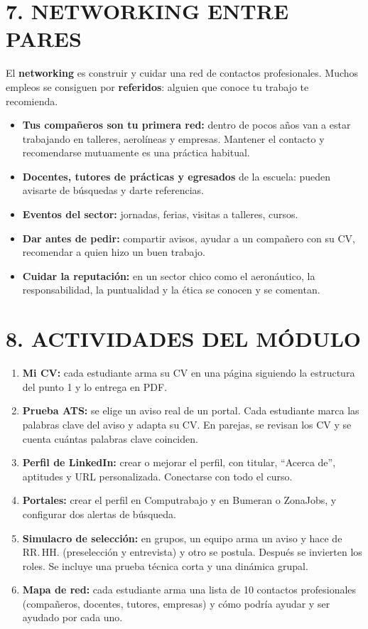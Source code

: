 \section*{7. NETWORKING ENTRE PARES}

El \textbf{networking} es construir y cuidar una red de contactos profesionales. Muchos
empleos se consiguen por \textbf{referidos}: alguien que conoce tu trabajo te recomienda.

\begin{itemize}
  \item \textbf{Tus compañeros son tu primera red:} dentro de pocos años van a estar trabajando
        en talleres, aerolíneas y empresas. Mantener el contacto y recomendarse mutuamente es
        una práctica habitual.
  \item \textbf{Docentes, tutores de prácticas y egresados} de la escuela: pueden avisarte de
        búsquedas y darte referencias.
  \item \textbf{Eventos del sector:} jornadas, ferias, visitas a talleres, cursos.
  \item \textbf{Dar antes de pedir:} compartir avisos, ayudar a un compañero con su CV,
        recomendar a quien hizo un buen trabajo.
  \item \textbf{Cuidar la reputación:} en un sector chico como el aeronáutico, la
        responsabilidad, la puntualidad y la ética se conocen y se comentan.
\end{itemize}

\section*{8. ACTIVIDADES DEL MÓDULO}

\begin{enumerate}
  \item \textbf{Mi CV:} cada estudiante arma su CV en una página siguiendo la estructura del
        punto 1 y lo entrega en PDF.
  \item \textbf{Prueba ATS:} se elige un aviso real de un portal. Cada estudiante marca las
        palabras clave del aviso y adapta su CV. En parejas, se revisan los CV y se cuenta
        cuántas palabras clave coinciden.
  \item \textbf{Perfil de LinkedIn:} crear o mejorar el perfil, con titular, ``Acerca de'',
        aptitudes y URL personalizada. Conectarse con todo el curso.
  \item \textbf{Portales:} crear el perfil en Computrabajo y en Bumeran o ZonaJobs, y
        configurar dos alertas de búsqueda.
  \item \textbf{Simulacro de selección:} en grupos, un equipo arma un aviso y hace de RR.\,HH.
        (preselección y entrevista) y otro se postula. Después se invierten los roles. Se
        incluye una prueba técnica corta y una dinámica grupal.
  \item \textbf{Mapa de red:} cada estudiante arma una lista de 10 contactos profesionales
        (compañeros, docentes, tutores, empresas) y cómo podría ayudar y ser ayudado por cada
        uno.
\end{enumerate}
